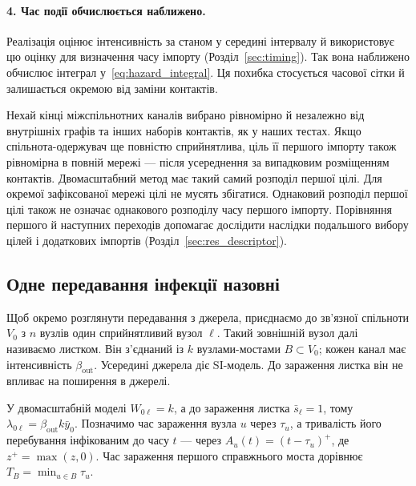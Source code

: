 \documentclass[a4paper,fleqn]{cas-sc}
\newcommand{\ibar}{\bar{y}}
\newcommand{\sbar}{\bar{s}}
\begin{document}
\paragraph{4. Час події обчислюється наближено.}
Реалізація оцінює інтенсивність за станом у середині інтервалу й використовує цю оцінку для визначення часу імпорту (Розділ~\ref{sec:timing}). Так вона наближено обчислює інтеграл у~\eqref{eq:hazard_integral}. Ця похибка стосується часової сітки й залишається окремою від заміни контактів.

\begin{remark}
\label{rem:placement}
Нехай кінці міжспільнотних каналів вибрано рівномірно й незалежно від внутрішніх графів та інших наборів контактів, як у наших тестах. Якщо спільнота-одержувач ще повністю сприйнятлива, ціль її першого імпорту також рівномірна в повній мережі --- після усереднення за випадковим розміщенням контактів. Двомасштабний метод має такий самий розподіл першої цілі. Для окремої зафіксованої мережі цілі не мусять збігатися. Однаковий розподіл першої цілі також не означає однакового розподілу часу першого імпорту. Порівняння першого й наступних переходів допомагає дослідити наслідки подальшого вибору цілей і додаткових імпортів (Розділ~\ref*{sec:res_descriptor}).
\end{remark}

\subsection{Одне передавання інфекції назовні}
\label{sec:single_export}

Щоб окремо розглянути передавання з джерела, приєднаємо до зв’язної спільноти $V_0$ з $n$ вузлів один сприйнятливий вузол $\ell$. Такий зовнішній вузол далі називаємо листком. Він з'єднаний із $k$ вузлами-мостами $B\subset V_0$; кожен канал має інтенсивність $\beta_{\mathrm{out}}$. Усередині джерела діє SI-модель. До зараження листка він не впливає на поширення в джерелі.
\par У двомасштабній моделі $W_{0\ell}=k$, а до зараження листка $\sbar_\ell=1$, тому $\lambda_{0\ell}=\beta_{\mathrm{out}}k\ibar_0$. Позначимо час зараження вузла $u$ через $\tau_u$, а тривалість його перебування інфікованим до часу $t$ --- через $A_u(t)=(t-\tau_u)^+$, де $z^+=\max(z,0)$. Час зараження першого справжнього моста дорівнює $T_B=\min_{u\in B}\tau_u$.
\end{document}
